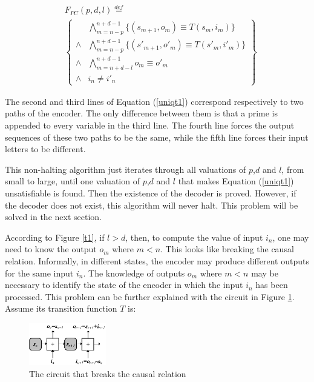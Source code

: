 \documentclass[journal]{IEEEtran}
\begin{document}
\begin{equation}\label{uniqt1}
\begin{split}
&F_{PC}(p,d,l)\overset{def}{=}\\
&\left\{
\begin{array}{cc}
&\bigwedge_{m=n-p}^{n+d-1}
\{
(s_{m+1},o_m)\equiv T(s_m,i_m)
\}
\\
\wedge&\bigwedge_{m=n-p}^{n+d-1}
\{
(s'_{m+1},o'_m)\equiv T(s'_m,i'_m)
\}
\\
\wedge&\bigwedge_{m=n+d-l}^{n+d-1}o_m\equiv o'_m \\
\wedge&i_n\ne i'_n
\end{array}
\right\}
\end{split}
\end{equation}


The second and third lines of Equation (\ref{uniqt1}) correspond respectively to two paths of the encoder.
The only difference between them is that a prime is appended to every variable in the third line.
The fourth line forces the output sequences of these two paths to be the same,
while the fifth line forces their input letters to be different.

This non-halting algorithm\cite{ShengYuShen:iccad09} just iterates through all valuations of $p$,$d$ and $l$,
from small to large,
until one valuation of $p$,$d$ and $l$ that makes Equation (\ref{uniqt1}) unsatisfiable is found.
Then the existence of the decoder is proved.
However,
if the decoder does not exist,
this algorithm will never halt.
This problem will be solved in the next section.


According to Figure \ref{t1},
if  $l > d$, then,
to compute the value of  input $i_n$,
one may need to know the output $o_m$ where $m < n$.
This looks like breaking the causal relation.
Informally,
in different states,
the encoder may produce different outputs for the same input $i_n$.
The knowledge of outputs $o_m$ where $m < n$ may be necessary to identify the state of the encoder in which the input $i_n$ has been processed.
This problem can be further explained with the circuit in Figure \ref{mealy_add}.
Assume its transition function $T$ is:

\begin{figure}[t]
\begin{center}
\includegraphics[width=0.3\textwidth]{mealy_add}
\end{center}
\caption{The circuit that breaks the causal relation}
  \label{mealy_add}
\end{figure}
\end{document}

